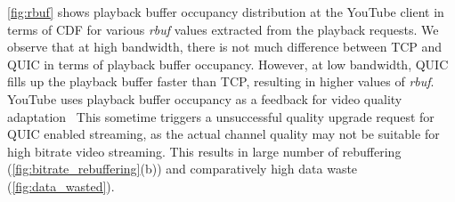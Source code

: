 \fig\ref{fig:rbuf} shows playback buffer occupancy distribution at the YouTube client in terms of \ac{CDF} for various \textit{rbuf} values extracted from the playback requests. We observe that at high bandwidth, there is not much difference between \ac{TCP} and \ac{QUIC} in terms of playback buffer occupancy. However, at low bandwidth, \ac{QUIC} fills up the playback buffer faster than \ac{TCP}, resulting in higher values of \textit{rbuf}. 
YouTube uses playback buffer occupancy as a feedback for video quality adaptation~\cite{mondal2017youtube,krishnappa2013dashing}
This sometime triggers a unsuccessful quality upgrade request for \ac{QUIC} enabled streaming, as the actual channel quality may not be suitable for high bitrate video streaming. This results in large number of rebuffering (\fig\ref{fig:bitrate_rebuffering}(b)) and comparatively high data waste (\fig\ref{fig:data_wasted}).



